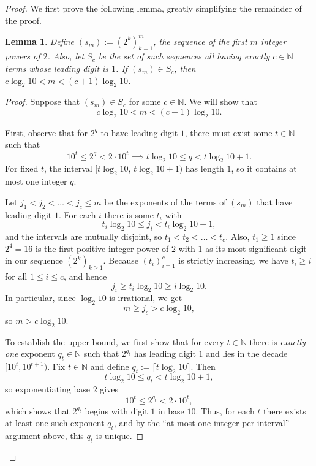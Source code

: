 \documentclass{article}
\newtheorem{lemma}{Lemma}
\newenvironment{lemmaproof}
  {\renewcommand{\qedsymbol}{$\blacksquare$}\begin{proof}}
  {\end{proof}}
\begin{document}
  \begin{proof}

  We first prove the following lemma, greatly simplifying the remainder of the proof.

  \begin{lemma}
  \label{lem:c-to-n-map}
    Define $(s_{m}) := (2^{k})_{k=1}^{m}$, the sequence of the first $m$ integer powers of $2$. 
    Also, let $S_{c}$ be the set of such sequences all having exactly $c \in \mathbb{N}$ terms whose leading digit is $1$.
    If $(s_{m}) \in S_{c}$, then $c \log_{2}{10} < m < (c + 1) \log_{2}{10}$.
  \end{lemma}

\begin{lemmaproof}
  Suppose that $(s_m) \in S_c$ for some $c \in \mathbb{N}$. We will show that
  \[
    c \log_2 10 < m < (c+1) \log_2 10.
  \]

  First, observe that for $2^q$ to have leading digit $1$, there must exist some $t \in \mathbb{N}$ such that
  \[
    10^t \le 2^q < 2 \cdot 10^t \implies t \log_2 10 \le q < t \log_2 10 + 1.
  \]
  For fixed $t$, the interval $[t \log_2 10,\,t \log_2 10 + 1)$ has length $1$, so it contains at most one integer $q$.

  Let $j_1 < j_2 < \dots < j_c \le m$ be the exponents of the terms of $(s_m)$ that have leading digit $1$. For each $i$ there is some $t_i$ with
  \[
    t_i \log_2 10 \le j_i < t_i \log_2 10 + 1,
  \]
  and the intervals are mutually disjoint, so $t_1 < t_2 < \dots < t_c$. Also, $t_1 \ge 1$ since $2^4 = 16$ is the first positive integer power of $2$ with $1$ as its most significant digit in our sequence $(2^k)_{k \ge 1}$. Because $(t_i)_{i=1}^c$ is strictly increasing, we have $t_i \ge i$ for all $1 \le i \le c$, and hence
  \[
    j_i \ge t_i \log_2 10 \ge i \log_2 10.
  \]
  In particular, since $\log_2 10$ is irrational, we get
  \[
    m \ge j_c > c \log_2 10,
  \]
  so $m > c \log_2 10$.

  To establish the upper bound, we first show that for every $t \in \mathbb{N}$ there is \emph{exactly one} exponent $q_t \in \mathbb{N}$ such that $2^{q_t}$ has leading digit $1$ and lies in the decade $[10^t,10^{t+1})$. Fix $t \in \mathbb{N}$ and define $q_t := \lceil t \log_2 10 \rceil$. Then
  \[
    t \log_2 10 \le q_t < t \log_2 10 + 1,
  \]
  so exponentiating base $2$ gives
  \[
    10^t \le 2^{q_t} < 2 \cdot 10^t,
  \]
  which shows that $2^{q_t}$ begins with digit $1$ in base $10$. Thus, for each $t$ there exists at least one such exponent $q_t$, and by the “at most one integer per interval” argument above, this $q_t$ is unique.


\end{lemmaproof}
\end{proof}
\end{document}
